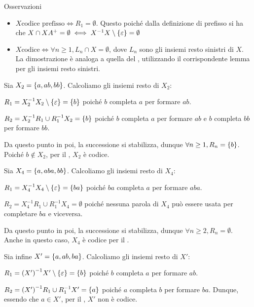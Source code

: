 \begin{note}{Osservazioni}
  \begin{itemize}
    \item \(X \text{codice prefisso} \iff R_1 = \emptyset\).
      Questo poiché dalla definizione di prefisso si ha che \(X \cap XA^+ = \emptyset \iff X^{-1}X \setminus \set{\varepsilon} = \emptyset\)
    \item \(X \text{codice} \iff \forall n \geq 1, L_n \cap X = \emptyset\),
      dove \(L_n\) sono gli insiemi resto sinistri di \(X\).
      La dimostrazione è analoga a quella del , utilizzando il corrispondente lemma per gli insiemi resto sinistri.
  \end{itemize}
\end{note}

\begin{example}{}
  Sia \(X_2 = \set{a,ab,bb}\). Calcoliamo gli insiemi resto di \(X_2\):

  \(R_1 = X_2^{-1}X_2 \setminus \set{\varepsilon} = \set{b}\)
  poiché \(b\) completa \(a\) per formare \(ab\).

  \(R_2 = X_2^{-1}R_1 \cup R_1^{-1}X_2 = \set{b}\)
  poiché \(b\) completa \(a\) per formare \(ab\) e \(b\) completa \(bb\) per formare \(bb\).

  Da questo punto in poi, la successione si stabilizza, dunque \(\forall n \geq 1, R_n = \set{b}\).
  Poiché \(b \not\in X_2\), per il , \(X_2\) è codice.

  Sia \(X_4 = \set{a,aba,bb}\). Calcoliamo gli insiemi resto di \(X_4\):
  
  \(R_1 = X_4^{-1}X_4 \setminus \set{\varepsilon} = \set{ba}\)
  poiché \(ba\) completa \(a\) per formare \(aba\).

  \(R_2 = X_4^{-1}R_1 \cup R_1^{-1}X_4 = \emptyset\)
  poiché nessuna parola di \(X_4\) può essere usata per completare \(ba\) e viceversa.
  
  Da questo punto in poi, la successione si stabilizza, dunque \(\forall n \geq 2, R_n = \emptyset\).
  Anche in questo caso, \(X_4\) è codice per il .

  Sia infine \(X' = \set{a,ab,ba}\). Calcoliamo gli insiemi resto di \(X'\):

  \(R_1 = {(X')}^{-1}X' \setminus \set{\varepsilon} = \set{b}\)
  poiché \(b\) completa \(a\) per formare \(ab\).
  
  \(R_2 = {(X')}^{-1}R_1 \cup R_1^{-1}X' = \set{a}\)
  poiché \(a\) completa \(b\) per formare \(ba\).
  Dunque, essendo che \(a \in X'\), per il , \(X'\) non è codice.
\end{example}

